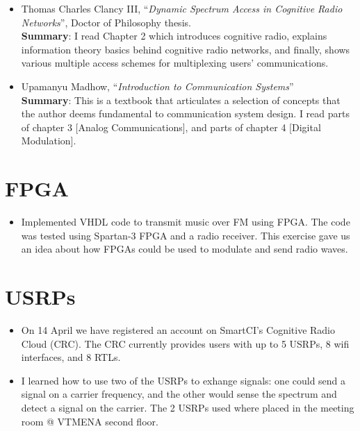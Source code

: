 \documentclass[]{scrartcl}
\begin{document}
\begin {itemize}
\item Thomas Charles Clancy III,
      ``\textit{Dynamic Spectrum Access in Cognitive Radio Networks}'',
      Doctor of Philosophy thesis.\\
      \textbf{Summary}:
      I read Chapter 2 which introduces cognitive radio, explains
      information theory basics behind cognitive radio networks,
      and finally, shows various multiple access schemes for multiplexing
      users' communications.

\item Upamanyu Madhow, ``\textit{Introduction to Communication Systems}''\\
      \textbf{Summary}:
      This is a textbook that articulates a selection of concepts
      that the author deems fundamental to communication system design.
      I read parts of chapter 3 [Analog Communications], and parts of
      chapter 4 [Digital Modulation].

\end{itemize}

\section{FPGA}

\begin{itemize}

\item Implemented VHDL code to transmit music over FM using FPGA. The code
      was tested using Spartan-3 FPGA and a radio receiver. This exercise
      gave us an idea about how FPGAs could be used to modulate and
      send radio waves.

\end{itemize}

\section{USRPs}

\begin{itemize}

\item On 14 April we have registered an account on SmartCI's Cognitive
      Radio Cloud (CRC). The CRC currently provides users with up to
      5 USRPs, 8 wifi interfaces, and 8 RTLs.

\item I learned how to use two of the USRPs to exhange
      signals: one could send a signal on a carrier frequency, and
      the other would sense the spectrum and detect a signal on the carrier.
      The 2 USRPs used where placed in the meeting room @ VTMENA second floor.

\end{itemize}
\end{document}
